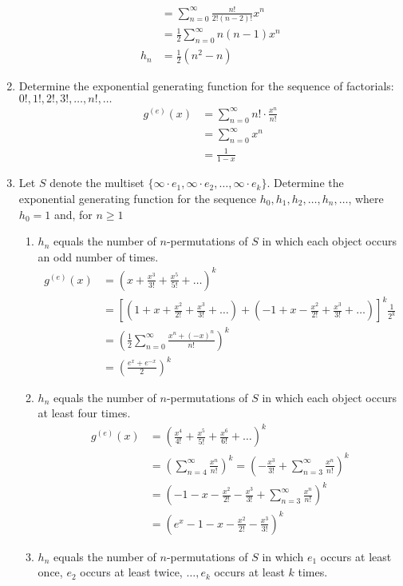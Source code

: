 \documentclass{article}
\begin{document}
\begin{enumerate}
\begin{align*}
  &=\sum\limits_{n=0}^\infty{\frac{n!}{2!(n-2)!}x^n}\\
  &=\frac{1}{2}\sum\limits_{n=0}^\infty{n(n-1)x^n}\\
  h_n&=\frac{1}{2}(n^2-n)
\end{align*}
\setcounter{enumi}{21}
\item
Determine the exponential generating function for the sequence of factorials: $0!,1!,2!,3!,\dots,n!,\dots$
\begin{align*}
  g^{(e)}(x)&=\sum\limits_{n=0}^\infty{n!\cdot\frac{x^n}{n!}}\\
  &=\sum\limits_{n=0}^\infty{x^n}\\
  &=\frac{1}{1-x}
\end{align*}
\setcounter{enumi}{23}
\item
Let $S$ denote the multiset $\{\infty\cdot e_1,\infty\cdot e_2,\dots,\infty\cdot e_k\}$. Determine the exponential generating function for the sequence $h_0,h_1,h_2,\dots,h_n,\dots$, where $h_0=1$ and, for $n\ge 1$
\begin{enumerate}
\item
$h_n$ equals the number of $n$-permutations of $S$ in which each object occurs an odd number of times.
\begin{align*}
  g^{(e)}(x)&=\left(x+\frac{x^3}{3!}+\frac{x^5}{5!}+\dots\right)^k\\
  &=\left[\left(1+x+\frac{x^2}{2!}+\frac{x^3}{3!}+\dots\right)+\left(-1+x-\frac{x^2}{2!}+\frac{x^3}{3!}+\dots\right)\right]^k\frac{1}{2^k}\\
  &=\left(\frac{1}{2}\sum\limits_{n=0}^\infty{\frac{x^n+(-x)^n}{n!}}\right)^k\\
  &=\left(\frac{e^x+e^{-x}}{2}\right)^k
\end{align*}
\item
$h_n$ equals the number of $n$-permutations of $S$ in which each object occurs at least four times.
\begin{align*}
  g^{(e)}(x)&=\left(\frac{x^4}{4!}+\frac{x^5}{5!}+\frac{x^6}{6!}+\dots\right)^k\\
  &=\left(\sum\limits_{n=4}^\infty{\frac{x^n}{n!}}\right)^k=\left(-\frac{x^3}{3!}+\sum\limits_{n=3}^\infty{\frac{x^n}{n!}}\right)^k\\
  &=\left(-1-x-\frac{x^2}{2!}-\frac{x^3}{3!}+\sum\limits_{n=3}^\infty{\frac{x^n}{n!}}\right)^k\\
  &=\left(e^x-1-x-\frac{x^2}{2!}-\frac{x^3}{3!}\right)^k
\end{align*}
\item
$h_n$ equals the number of $n$-permutations of $S$ in which $e_1$ occurs at least once, $e_2$ occurs at least twice, $\dots,e_k$ occurs at least $k$ times.

\end{enumerate}
\end{enumerate}
\end{document}
